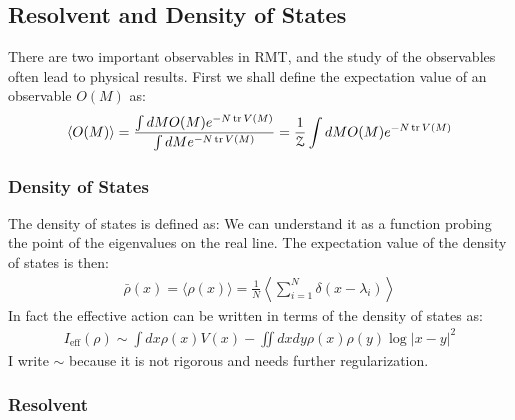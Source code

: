 \subsection{Resolvent and Density of States}

There are two important observables in RMT, and the study of the observables often lead to physical results. First we shall define the expectation value of an observable $ O(M) $ as:
\begin{align}
  \langle O(M) \rangle = \displaystyle\frac{\int dM O(M) e^{-N \tr V(M)}}{\int dM e^{-N \tr V(M)}} = \displaystyle\frac{1}{\mathcal{Z}} \int dM O(M) e^{-N \tr V(M)}
\end{align}

\subsubsection{Density of States}

The density of states is defined as:
We can understand it as a function probing the point of the eigenvalues on the real line. 
The expectation value of the density of states is then:
\begin{align}
  \bar{\rho}(x) = \langle \rho(x) \rangle = \displaystyle\frac{1}{N} \left\langle \sum_{i=1}^N \delta(x - \lambda_i) \right\rangle
\end{align}
In fact the effective action can be written in terms of the density of states as:
\begin{align}
  I_{\text{eff}}(\rho) \sim \int dx \rho(x) V(x) - \iint dx dy \rho(x) \rho(y) \log|x-y|^2
\end{align}
I write $ \sim $ because it is not rigorous and needs further regularization. 

\subsubsection{Resolvent}

